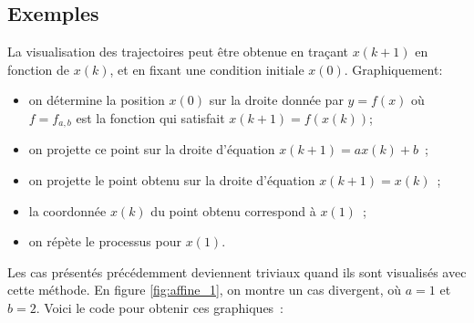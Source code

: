         \subsection{Exemples}
            La visualisation des trajectoires peut être obtenue en traçant $x(k+1)$ en fonction de $x(k)$, et en fixant une condition initiale $x(0)$. Graphiquement:
            \begin{itemize}
                \item on détermine la position $x(0)$ sur la droite  donnée par $y = f(x)$ où $f = f_{a,b}$ est la fonction qui satisfait $x(k+1) = f(x(k))$;
                \item on projette ce point sur la droite d'équation $x(k+1) = ax(k)+b$~;
                \item on projette le point obtenu sur la droite d'équation $x(k+1)=x(k)$~;
                \item la coordonnée $x(k)$ du point obtenu correspond à $x(1)$~;
                \item on répète le processus pour $x(1)$.
            \end{itemize}
            Les cas présentés précédemment deviennent triviaux quand ils sont visualisés avec cette méthode. En figure \ref{fig:affine_1}, on montre un cas divergent, où $a=1$ et $b=2$.
            Voici le code pour obtenir ces graphiques~:
            \inputminted{python}{codes/affine_un_pas.py}
            
